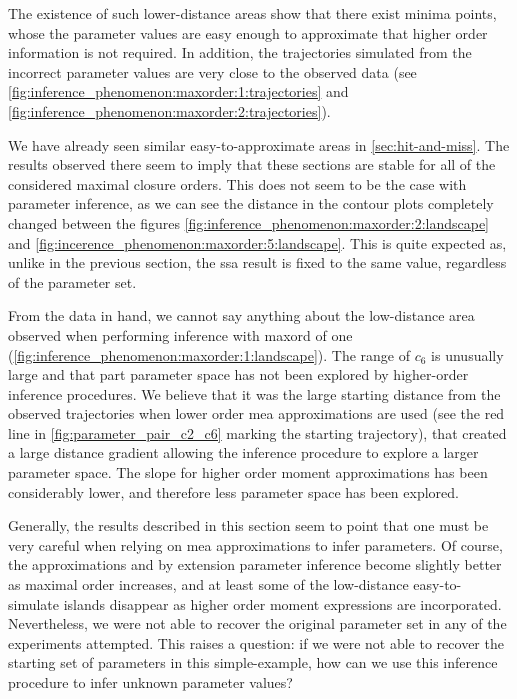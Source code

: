 The existence of such lower-distance areas show that there exist minima  points, whose the parameter values are easy enough to approximate that higher order information is not required. In addition, the trajectories simulated from the incorrect parameter values are very close to the observed data (see \autoref{fig:inference_phenomenon:maxorder:1:trajectories} and \autoref{fig:inference_phenomenon:maxorder:2:trajectories}).

We have already seen similar easy-to-approximate areas in \autoref{sec:hit-and-miss}. 
The results observed there seem to imply that these sections are stable for all of the considered maximal closure orders. 
This does not seem to be the case with parameter inference, as we can see the distance in the contour plots completely changed between the figures \ref{fig:inference_phenomenon:maxorder:2:landscape} and \ref{fig:incerence_phenomenon:maxorder:5:landscape}.
This is quite expected as, unlike in the previous section, the \gls{ssa} result is fixed to the same value, regardless of the parameter set.

From the data in hand, we cannot say anything about the low-distance area observed when performing inference with \gls{maxord} of one 
(\autoref{fig:inference_phenomenon:maxorder:1:landscape}). 
The range of $c_6$ is unusually large and that part parameter space has not been explored by higher-order inference procedures. 
We believe that it was the large starting distance from the observed trajectories when lower order \gls{mea} approximations are used  (see the red line in \autoref{fig:parameter_pair_c2_c6} marking the starting trajectory), that created a large distance gradient allowing the inference procedure to explore a larger parameter space. The slope for higher order moment approximations has been considerably lower, and therefore less parameter space has been explored.

Generally, the results described in this section seem to point that one must be very careful when relying on \gls{mea} approximations to infer parameters. Of course, the approximations and by extension parameter inference become slightly better as maximal order increases, and at least some of the low-distance easy-to-simulate islands disappear as higher order moment expressions are incorporated. Nevertheless, we were not able to recover the original parameter set in any of the experiments attempted. This raises a question: if we were not able to recover the starting set of parameters in this simple-example, how can we use this inference procedure to infer unknown parameter values? 


